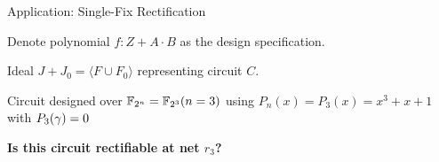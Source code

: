 \begin{frame}{\large Application: Single-Fix Rectification}
\bi
	\item Denote polynomial $f: Z + A\cdot B$ as the design specification.
	\vspace{0.1in}
	\pause
	\item Ideal $J+J_0=\langle F\cup F_0\rangle$ representing circuit $C$.
	\vspace{0.1in}
	\vspace{0.1in}
	\pause
	\item Circuit designed over ${\mathbb{F}}_{2^n} = {\mathbb{F}}_{2^3} (n=3)$ using 
	$P_n(x) = P_3(x) = x^3+x+1$ with $P_3(\gamma)=0$

	\vspace{0.1in}
\pause
\item {\bf Is this circuit rectifiable at net $r_3$?}
\ei



\end{frame}




